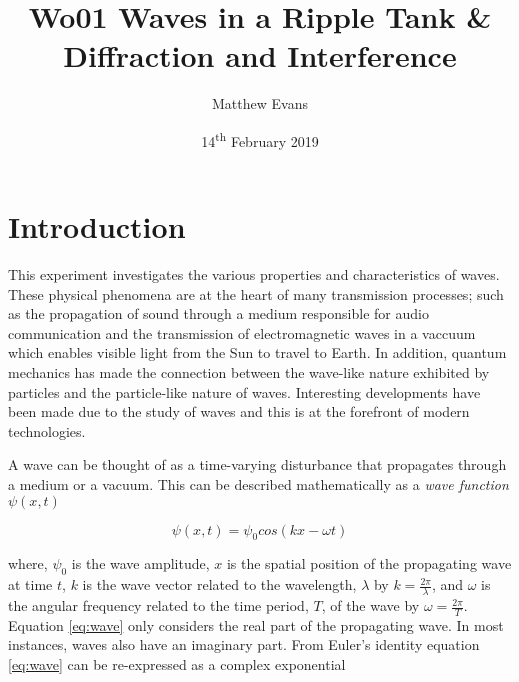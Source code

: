 \documentclass{article}
\begin{document}
\title{Wo01 Waves in a Ripple Tank \& Diffraction and Interference} %
\author{Matthew Evans}%
\date{14\textsuperscript{th} February 2019} %
\maketitle %



\section{Introduction}
\label{sec:introduction}

This experiment investigates the various properties and characteristics of waves. These physical phenomena are at the heart of many transmission processes; such as the propagation of sound through a medium responsible for audio communication and the transmission of electromagnetic waves in a vaccuum which enables visible light from the Sun to travel to Earth. In addition, quantum mechanics has made the connection between the wave-like nature exhibited by particles and the particle-like nature of waves. Interesting developments have been made due to the study of waves and this is at the forefront of modern technologies.

\vspace{2mm}
\noindent
A wave can be thought of as a time-varying disturbance that propagates through a medium or a vacuum. This can be described mathematically as a \textit{wave function} $\psi(x, t)$

\begin{equation}
\label{eq:wave}
\psi(x, t) = \psi_0 cos(kx - \omega t)
\end{equation}

\vspace{2mm}
\noindent
where, $\psi_0$ is the wave amplitude, $x$ is the spatial position of the propagating wave at time $t$, $k$ is the wave vector related to the wavelength, $\lambda$ by $k = \frac{2\pi}{\lambda}$, and $\omega$ is the angular frequency related to the time period, $T$, of the wave by $\omega = \frac{2\pi}{T}$. Equation \eqref{eq:wave} only considers the real part of the propagating wave. In most instances, waves also have an imaginary part. From Euler's identity equation \eqref{eq:wave} can be re-expressed as a complex exponential
\end{document}
